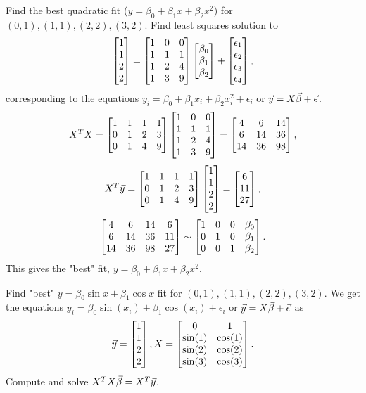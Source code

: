 \documentclass[10pt,a4paper]{article}
\begin{document}
\begin{example}
	Find the best quadratic fit ($y=\beta_0+\beta_1x+\beta_2x^2$) for $(0,1),(1,1),(2,2),(3,2)$.
	Find least squares solution to 
	$$\begin{bmatrix}1\\1\\2\\2\end{bmatrix} = \begin{bmatrix}1&0&0\\1&1&1\\1&2&4\\1&3&9\end{bmatrix}\begin{bmatrix}\beta_0\\\beta_1\\\beta_2\end{bmatrix} + \begin{bmatrix}\epsilon_1\\\epsilon_2\\\epsilon_3\\\epsilon_4\end{bmatrix},$$
	corresponding to the equations $y_i = \beta_0+\beta_1x_i+\beta_2x_i^2+\epsilon_i$ or $\vec{y}=X\vec{\beta}+\vec{\epsilon}$.
	$$X^TX = \begin{bmatrix}1&1&1&1\\0&1&2&3\\0&1&4&9\end{bmatrix}\begin{bmatrix}1&0&0\\1&1&1\\1&2&4\\1&3&9\end{bmatrix} = \begin{bmatrix}4&6&14\\6&14&36\\14&36&98\end{bmatrix},$$
	$$X^T\vec{y} = \begin{bmatrix}1&1&1&1\\0&1&2&3\\0&1&4&9\end{bmatrix}\begin{bmatrix}1\\1\\2\\2\end{bmatrix} = \begin{bmatrix}6\\11\\27\end{bmatrix},$$
	$$\begin{bmatrix}4&6&14&6\\6&14&36&11\\14&36&98&27\end{bmatrix} \sim \begin{bmatrix}1&0&0&\beta_0\\0&1&0&\beta_1\\0&0&1&\beta_2\end{bmatrix}. $$
	This gives the "best" fit, $y=\beta_0+\beta_1x+\beta_2x^2$.
\end{example}
\begin{example}
	Find "best" $y=\beta_0\sin x + \beta_1\cos x$ fit for $(0,1),(1,1),(2,2),(3,2)$.
	We get the equations $y_i = \beta_0\sin(x_i) + \beta_1\cos(x_i) + \epsilon_i$ or $\vec{y}=X\vec{\beta} + \vec{\epsilon}$ as
	$$\vec{y}=\begin{bmatrix}1\\1\\2\\2\end{bmatrix}, X = \begin{bmatrix}0&1\\\sin(1)&\cos(1)\\\sin(2)&\cos(2)\\\sin(3)&\cos(3)\end{bmatrix}.$$
	Compute and solve $X^TX\vec{\beta} = X^T\vec{y}$.
\end{example}
\end{document}
